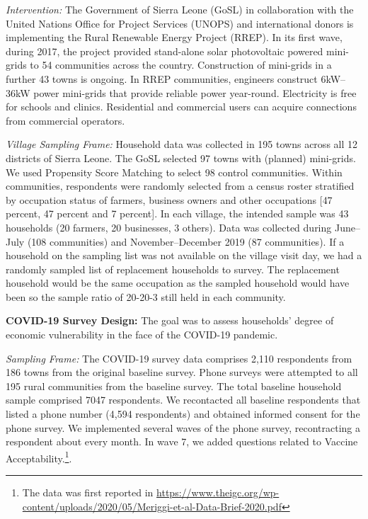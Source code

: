 \documentclass[
  12pt,
]{article}
\begin{document}
\emph{Intervention:} The Government of Sierra Leone (GoSL) in collaboration with the United Nations Office for Project Services (UNOPS) and international donors is implementing the Rural Renewable Energy Project (RREP). In its first wave, during 2017, the project provided stand-alone solar photovoltaic powered mini-grids to 54 communities across the country. Construction of mini-grids in a further 43 towns is ongoing. In RREP communities, engineers construct 6kW--36kW power mini-grids that provide reliable power year-round. Electricity is free for schools and clinics. Residential and commercial users can acquire connections from commercial operators.

\emph{Village Sampling Frame:} Household data was collected in 195 towns across all 12 districts of Sierra Leone. The GoSL selected 97 towns with (planned) mini-grids. We used Propensity Score Matching to select 98 control communities. Within communities, respondents were randomly selected from a census roster stratified by occupation status of farmers, business owners and other occupations {[}47 percent, 47 percent and 7 percent{]}. In each village, the intended sample was 43 households (20 farmers, 20 businesses, 3 others). Data was collected during June--July (108 communities) and November--December 2019 (87 communities). If a household on the sampling list was not available on the village visit day, we had a randomly sampled list of replacement households to survey. The replacement household would be the same occupation as the sampled household would have been so the sample ratio of 20-20-3 still held in each community.

\textbf{COVID-19 Survey Design:} The goal was to assess households' degree of economic vulnerability in the face of the COVID-19 pandemic.

\emph{Sampling Frame:} The COVID-19 survey data comprises 2,110 respondents from 186 towns from the original baseline survey. Phone surveys were attempted to all 195 rural communities from the baseline survey. The total baseline household sample comprised 7047 respondents. We recontacted all baseline respondents that listed a phone number (4,594 respondents) and obtained informed consent for the phone survey. We implemented several waves of the phone survey, recontracting a respondent about every month. In wave 7, we added questions related to Vaccine Acceptability.\footnote{The data was first reported in \url{https://www.theigc.org/wp-content/uploads/2020/05/Meriggi-et-al-Data-Brief-2020.pdf}}.
\end{document}
